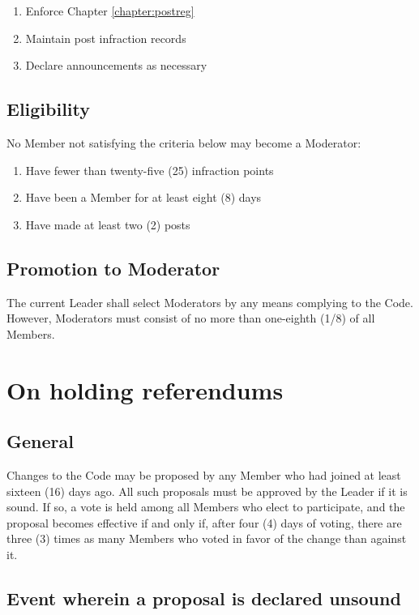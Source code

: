 \documentclass[10pt]{book}
\begin{document}
\begin{enumerate}
 \item Enforce Chapter \ref{chapter:postreg}
 \item Maintain post infraction records
 \item Declare announcements as necessary
\end{enumerate}

\subsection{Eligibility}

No Member not satisfying the criteria below may become a Moderator:

\begin{enumerate}
 \item Have fewer than twenty-five (25) infraction points
 \item Have been a Member for at least eight (8) days
 \item Have made at least two (2) posts
\end{enumerate}

\subsection{Promotion to Moderator}

The current Leader shall select Moderators by any means complying to the Code. However, Moderators must consist of no more than one-eighth (1/8) of all Members.

\section{On holding referendums}

\subsection{General}

Changes to the Code may be proposed by any Member who had joined at least sixteen (16) days ago. All such proposals must be approved by the Leader if it is sound. If so, a vote is held among all Members who elect to participate, and the proposal becomes effective if and only if, after four (4) days of voting, there are three (3) times as many Members who voted in favor of the change than against it.

\subsection{Event wherein a proposal is declared unsound}
\end{document}

